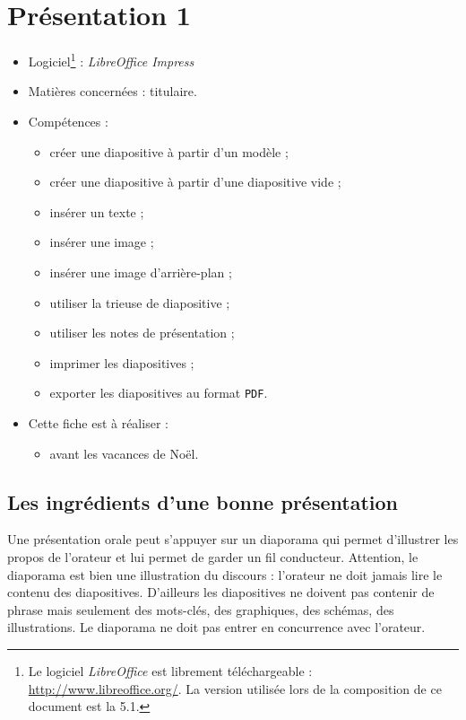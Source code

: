 \chapter{Présentation 1}  


{\footnotesize
\begin{itemize}
\item Logiciel\footnote{Le logiciel \emph{LibreOffice} est librement téléchargeable : \url{http://www.libreoffice.org/}. La version utilisée lors de la composition de ce document est la 5.1.} : \emph{LibreOffice Impress} 
\item Matières concernées : titulaire.
\item Compétences : 
        \begin{itemize}
        \item créer une diapositive à partir d'un modèle ; 
	\item créer une diapositive à partir d'une diapositive vide ;
	\item insérer un texte ;
	\item insérer une image ;
	\item insérer une image d'arrière-plan ;
	\item utiliser la trieuse de diapositive ;
	\item utiliser les notes de présentation ;
	\item imprimer les diapositives ;
	\item exporter les diapositives au format \texttt{PDF}.
        \end{itemize}
\item Cette fiche est à réaliser :
        \begin{itemize}
        \item avant les vacances de Noël. 
        \end{itemize}
\end{itemize}
}%



\section{Les ingrédients d'une bonne présentation}

Une présentation orale peut s'appuyer sur un diaporama qui permet d'illustrer les propos de l'orateur et lui permet de garder un fil conducteur. Attention, le diaporama est bien une illustration du discours : l'orateur ne doit jamais lire le contenu des diapositives. D'ailleurs les diapositives ne doivent pas contenir de phrase mais seulement des mots-clés, des graphiques, des schémas, des illustrations. Le diaporama ne doit pas entrer en concurrence avec l'orateur.

